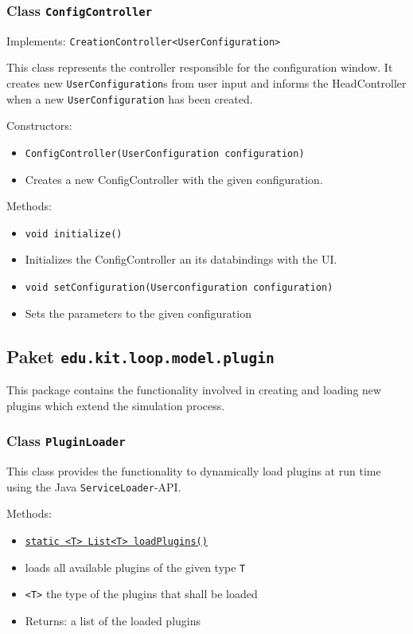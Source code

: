 \documentclass[parskip=full,11pt]{scrartcl}
\begin{document}
\subsubsection{Class \texttt{ConfigController}}

Implements: \texttt{CreationController<UserConfiguration>}

This class represents the controller responsible for the configuration window. It creates new \texttt{UserConfiguration}s from user input and informs the HeadController when a new \texttt{UserConfiguration} has been created.

Constructors:
\begin{itemize}\itemsep -10pt
\item \texttt{ConfigController(UserConfiguration configuration)}
\item[] Creates a new ConfigController with the given configuration.
\end{itemize}

Methods:
\begin{itemize}\itemsep -10pt
\item \texttt{void initialize()}
\item[] Initializes the ConfigController an its databindings with the UI.

\item \texttt{void setConfiguration(Userconfiguration configuration)}
\item[] Sets the parameters to the given configuration

\end{itemize}

\subsection{Paket \texttt{edu.kit.loop.model.plugin}}

This package contains the functionality involved in creating and loading new plugins which extend the simulation process.

\subsubsection{Class \texttt{PluginLoader}}

This class provides the functionality to dynamically load plugins at run time using the Java \texttt{ServiceLoader}-API.

Methods:

\begin{itemize}\itemsep -10pt
	\item \underline{\texttt{static <T> List<T> loadPlugins()}}
	\item[] loads all available plugins of the given type \texttt{T}
	\item[] \texttt{<T>} the type of the plugins that shall be loaded
	\item[]Returns: a list of the loaded plugins
\end{itemize}
\end{document}
